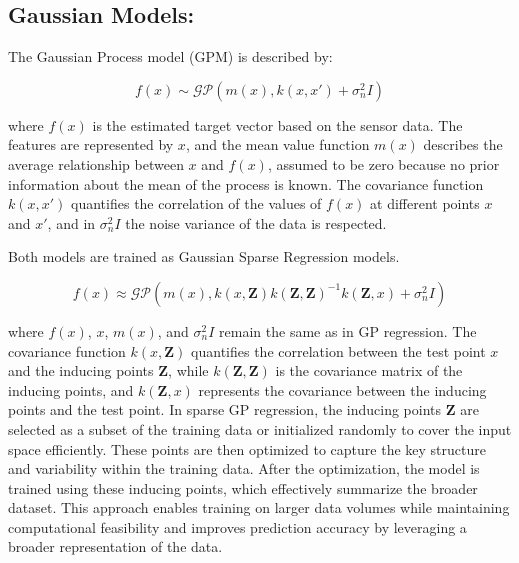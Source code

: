     \subsection{Gaussian Models:}
    \label{subsec:gaussian}
    The Gaussian Process model (GPM) is described by:
    
    \begin{equation}
    f(x) \sim \mathcal{GP} \left( m(x), k(x, x') + \sigma_n^2 I \right)
    \label{eq:gp_regression}
    \end{equation}

    
    
    where \( f(x) \) is the estimated target vector based on the sensor data. The features are represented by \( x \), and the mean value function \( m(x) \) describes the average relationship between \( x \) and \( f(x) \), assumed to be zero because no prior information about the mean of the process is known. The covariance function \( k(x, x') \) quantifies the correlation of the values of \( f(x) \) at different points \( x \) and \( x' \), and in \( \sigma_n^2 I \) the noise variance of the data is respected. 

    Both models are trained as Gaussian Sparse Regression models.

    \begin{equation}
    f(x) \approx \mathcal{GP} \left( m(x), k(x, \boldsymbol{Z}) k(\boldsymbol{Z}, \boldsymbol{Z})^{-1} k(\boldsymbol{Z}, x) + \sigma_n^2 I \right)
    \label{eq:gp_sparse_regression}
    \end{equation}

     where \(f(x)\), \(x\), \(m(x)\), and \(\sigma_n^2 I\) remain the same as in GP regression. The covariance function \(k(x, \boldsymbol{Z})\) quantifies the correlation between the test point \(x\) and the inducing points \(\boldsymbol{Z}\), while \(k(\boldsymbol{Z}, \boldsymbol{Z})\) is the covariance matrix of the inducing points, and \(k(\boldsymbol{Z}, x)\) represents the covariance between the inducing points and the test point. In sparse GP regression, the inducing points \( \boldsymbol{Z} \) are selected as a subset of the training data or initialized randomly to cover the input space efficiently. These points are then optimized to capture the key structure and variability within the training data. After the optimization, the model is trained using these inducing points, which effectively summarize the broader dataset. This approach enables training on larger data volumes while maintaining computational feasibility and improves prediction accuracy by leveraging a broader representation of the data.


